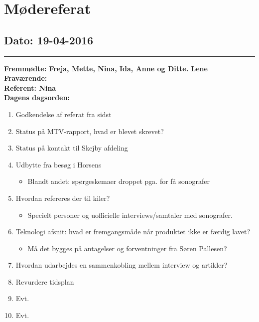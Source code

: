 \chapter{Mødereferat}

\section{Dato: 19-04-2016}
\hrule
\textbf{Fremmødte: Freja, Mette, Nina, Ida, Anne og Ditte. Lene} \\
\textbf{Fraværende:} \\
\textbf{Referent: Nina } \\
\textbf{Dagens dagsorden: }
\begin{enumerate}
	\item Godkendelse af referat fra sidst
\item Status på MTV-rapport, hvad er blevet skrevet?
\item Status på kontakt til Skejby afdeling
\item Udbytte fra besøg i Horsens
\begin{itemize}
\item Blandt andet: spørgeskemaer droppet pga. for få sonografer
\end{itemize}
\item  Hvordan refereres der til kiler?
\begin{itemize}
\item Specielt personer og uofficielle interviews/samtaler med sonografer.
\end{itemize}
\item Teknologi afsnit: hvad er fremgangsmåde når produktet ikke er færdig lavet?
\begin{itemize}
\item Må det bygges på antagelser og forventninger fra Søren Pallesen?
\end{itemize}
\item Hvordan udarbejdes en sammenkobling mellem interview og artikler?
\item Revurdere tidsplan
\item Evt.

	\item Evt. 
\end{enumerate}

